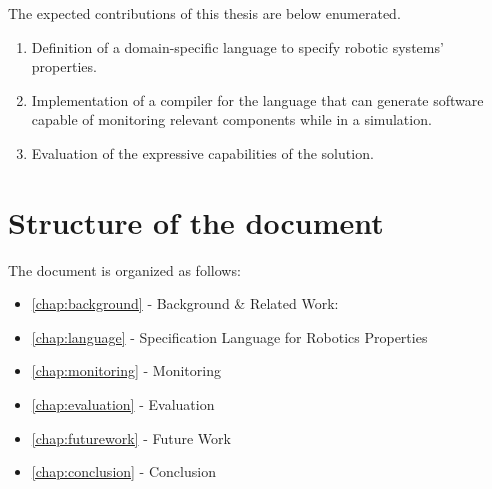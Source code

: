The expected contributions of this thesis are below enumerated.

\begin{enumerate}
    \item Definition of a domain-specific language to specify robotic systems' properties.
    \item Implementation of a compiler for the language that can generate software capable of monitoring relevant components while in a simulation.
    \item Evaluation of the expressive capabilities of the solution.
\end{enumerate}


\section{Structure of the document}
\label{sec:structure}

The document is organized as follows:

\begin{itemize}
    \item \autoref{chap:background} - Background \& Related Work:
    \item \autoref{chap:language} - Specification Language for Robotics Properties
    \item \autoref{chap:monitoring} - Monitoring
    \item \autoref{chap:evaluation} - Evaluation 
    \item \autoref{chap:futurework} - Future Work
    \item \autoref{chap:conclusion} - Conclusion
\end{itemize}
